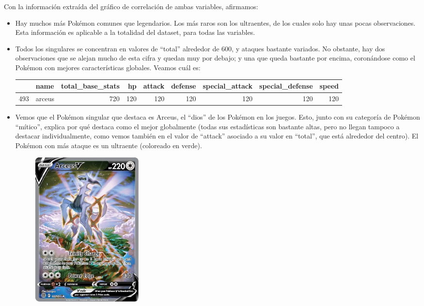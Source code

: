 \documentclass[
  12pt,
]{extreport}
\begin{document}
Con la información extraída del gráfico de correlación de ambas
variables, afirmamos:

\begin{itemize}
\item
  Hay muchos más Pokémon comunes que legendarios. Los más raros son los
  ultraentes, de los cuales solo hay unas pocas observaciones. Esta
  información es aplicable a la totalidad del dataset, para todas las
  variables.
\item
  Todos los singulares se concentran en valores de ``total'' alrededor
  de 600, y ataques bastante variados. No obstante, hay dos
  observaciones que se alejan mucho de esta cifra y quedan muy por
  debajo; y una que queda bastante por encima, coronándose como el
  Pokémon con mejores características globales. Veamos cuál es:

  \begin{table}[H]
  \centering\begingroup\fontsize{9.5}{11.5}\selectfont

  \begin{tabular}{llrrrrrrr}
  \toprule
    & name & total\_base\_stats & hp & attack & defense & special\_attack & special\_defense & speed\\
  \midrule
  493 & arceus & 720 & 120 & 120 & 120 & 120 & 120 & 120\\
  \bottomrule
  \end{tabular}
  \endgroup{}
  \end{table}
\item
  Vemos que el Pokémon singular que destaca es Arceus, el ``dios'' de
  los Pokémon en los juegos. Esto, junto con su categoría de Pokémon
  ``mítico'', explica por qué destaca como el mejor globalmente (todas
  sus estadísticas son bastante altas, pero no llegan tampoco a destacar
  individualmente, como vemos también en el valor de ``attack'' asociado
  a su valor en ``total'', que está alrededor del centro). El Pokémon
  con más ataque es un ultraente (coloreado en verde).

  \begin{figure}[H]

  {\centering \includegraphics[width=2.23958in,height=\textheight]{trabajo_images/arceus_carta.jpg}

}
\end{figure}
\end{itemize}
\end{document}
